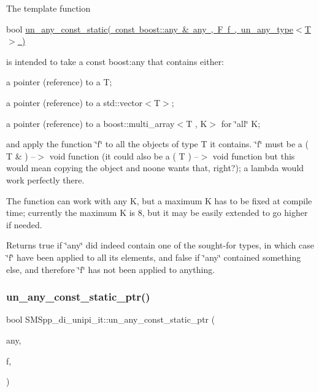 The template function

bool \mbox{\hyperlink{group__boost__any__stuff_ga4d88b50d748bc8cbf4647b5db0ea44f0}{un\+\_\+any\+\_\+const\+\_\+static( const boost\+::any \& any , F f , un\+\_\+any\+\_\+type$<$\+T$>$ )}}

is intended to take a const boost\+:any that contains either\+:


\begin{DoxyItemize}
\item a pointer (reference) to a T;
\item a pointer (reference) to a std\+::vector$<$\+T$>$;
\item a pointer (reference) to a boost\+::multi\+\_\+array$<$\+T , K$>$ for \char`\"{}all\char`\"{} K;
\end{DoxyItemize}

and apply the function \char`\"{}f\char`\"{} to all the objects of type T it contains. \char`\"{}f\char`\"{} must be a ( T \& ) --$>$ void function (it could also be a ( T ) --$>$ void function but this would mean copying the object and noone wants that, right?); a lambda would work perfectly there.

The function can work with any K, but a maximum K has to be fixed at compile time; currently the maximum K is 8, but it may be easily extended to go higher if needed.

Returns true if \char`\"{}any\char`\"{} did indeed contain one of the sought-\/for types, in which case \char`\"{}f\char`\"{} have been applied to all its elements, and false if \char`\"{}any\char`\"{} contained something else, and therefore \char`\"{}f\char`\"{} has not been applied to anything. \mbox{\label{group__boost__any__stuff_ga46275e01a585a3a4bfcc243a595aa7dd}} 
\subsubsection{\texorpdfstring{un\+\_\+any\+\_\+const\+\_\+static\+\_\+ptr()}{un\_any\_const\_static\_ptr()}}
{\footnotesize\ttfamily bool S\+M\+Spp\+\_\+di\+\_\+unipi\+\_\+it\+::un\+\_\+any\+\_\+const\+\_\+static\+\_\+ptr (\begin{DoxyParamCaption}\item[{const boost\+::any \&}]{any,  }\item[{F}]{f,  }\item[{\mbox{\hyperlink{struct_s_m_spp__di__unipi__it_1_1un__any__type}{un\+\_\+any\+\_\+type}}$<$ T $>$}]{ }\end{DoxyParamCaption})}

